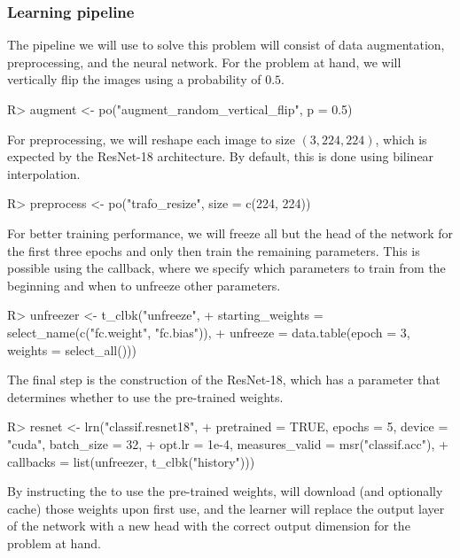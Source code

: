 \documentclass[article]{jss}
\theoremstyle{definition}
\begin{document}
\subsubsection{Learning pipeline}

The pipeline we will use to solve this problem will consist of data augmentation, preprocessing, and the neural network.
For the problem at hand, we will vertically flip the images using a probability of $0.5$.

\begin{CodeInput}
R> augment <- po("augment_random_vertical_flip", p = 0.5)
\end{CodeInput}

For preprocessing, we will reshape each image to size $(3, 224, 224)$, which is expected by the ResNet-18 architecture.
By default, this is done using bilinear interpolation.

\begin{CodeInput}
R> preprocess <- po("trafo_resize", size = c(224, 224))
\end{CodeInput}

For better training performance, we will freeze all but the head of the network for the first three epochs and only then train the remaining parameters.
This is possible using the  callback, where we specify which parameters to train from the beginning and when to unfreeze other parameters.

\begin{CodeInput}
R> unfreezer <- t_clbk("unfreeze",
+    starting_weights = select_name(c("fc.weight", "fc.bias")),
+    unfreeze = data.table(epoch = 3, weights = select_all()))
\end{CodeInput}

The final step is the construction of the ResNet-18, which has a parameter  that determines whether to use the pre-trained weights.

\begin{CodeInput}
R> resnet <- lrn("classif.resnet18",
+    pretrained = TRUE, epochs = 5, device = "cuda", batch_size = 32,
+    opt.lr = 1e-4, measures_valid = msr("classif.acc"),
+    callbacks = list(unfreezer, t_clbk("history")))
\end{CodeInput}

By instructing the  to use the pre-trained weights,  will download (and optionally cache) those weights upon first use, and the \mlrttorch{} learner will replace the output layer of the network with a new head with the correct output dimension for the problem at hand.
\end{document}
